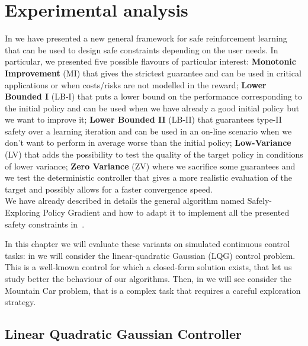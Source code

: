 \chapter{Experimental analysis}
\label{ch:experim}
\thispagestyle{empty}

\fancyhead[LE,RO]{\bfseries\thepage}                               
\fancyhead[RE]{\bfseries\leftmark}    
\fancyhead[LO]{\bfseries\rightmark}  

In  we have presented a new general framework for safe reinforcement learning that can be used to design safe constraints depending on the user needs. In particular, we presented five possible flavours of particular interest: \textbf{Monotonic Improvement} (MI) that gives the strictest guarantee and can be used in critical applications or when costs/risks are not modelled in the reward; \textbf{Lower Bounded I} (LB-I) that puts a lower bound on the performance corresponding to the initial policy and can be used when we have already a good initial policy but we want to improve it; \textbf{Lower Bounded II} (LB-II) that guarantees type-II safety over a learning iteration and can be used in an on-line scenario when we don't want to perform in average worse than the initial policy; \textbf{Low-Variance} (LV) that adds the possibility to test the quality of the target policy in conditions of lower variance; \textbf{Zero Variance} (ZV) where we sacrifice some guarantees and we test the deterministic controller that gives a more realistic evaluation of the target and possibly allows for a faster convergence speed.\\
We have already described in details the general algorithm named Safely-Exploring Policy Gradient and how to adapt it to implement all the presented safety constraints in~. 

In this chapter we will evaluate these variants on simulated continuous control tasks: in  we will consider the linear-quadratic Gaussian (LQG) control problem. This is a well-known control for which a closed-form solution exists, that let us study better the behaviour of our algorithms. Then, in  we will see consider the Mountain Car problem, that is a complex task that requires a careful exploration strategy. 


\section{Linear Quadratic Gaussian Controller}\label{sec:lqg}

